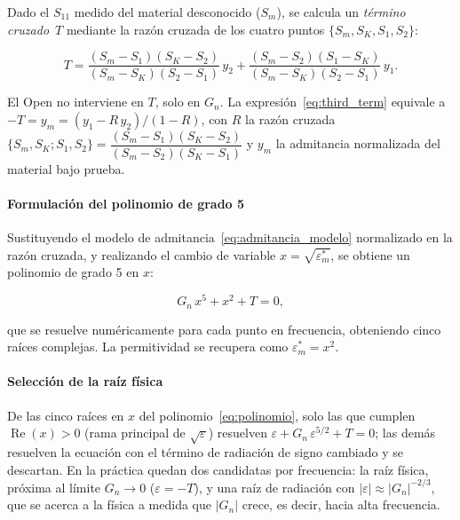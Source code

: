 Dado el $S_{11}$ medido del material desconocido ($S_m$), se calcula un
\emph{término cruzado}~$T$ mediante la razón cruzada de los cuatro puntos
$\{S_m, S_K, S_1, S_2\}$:

\begin{equation}
    T = \frac{(S_m - S_1)(S_K - S_2)}{(S_m - S_K)(S_2 - S_1)}\,y_2
      + \frac{(S_m - S_2)(S_1 - S_K)}{(S_m - S_K)(S_2 - S_1)}\,y_1.
    \label{eq:third_term}
\end{equation}

\noindent El Open no interviene en $T$, solo en $G_n$. La
expresión~\eqref{eq:third_term} equivale a $-T = y_m = (y_1 - R\,y_2)/(1 - R)$,
con $R$ la razón cruzada
$\{S_m, S_K; S_1, S_2\} = \dfrac{(S_m - S_1)(S_K - S_2)}{(S_m - S_2)(S_K - S_1)}$
y $y_m$ la admitancia normalizada del material bajo prueba.

\paragraph{Formulación del polinomio de grado 5}

Sustituyendo el modelo de admitancia~\eqref{eq:admitancia_modelo} normalizado
en la razón cruzada, y realizando el cambio de variable $x = \sqrt{\varepsilon_m^*}$,
se obtiene un polinomio de grado 5 en $x$:

\begin{equation}
    G_n\,x^5 + x^2 + T = 0,
    \label{eq:polinomio}
\end{equation}

que se resuelve numéricamente para cada punto en frecuencia, obteniendo cinco
raíces complejas. La permitividad se recupera como $\varepsilon_m^* = x^2$.

\paragraph{Selección de la raíz física}

De las cinco raíces en $x$ del polinomio~\eqref{eq:polinomio}, solo las que
cumplen $\operatorname{Re}(x) > 0$ (rama principal de $\sqrt{\varepsilon}$)
resuelven $\varepsilon + G_n\,\varepsilon^{5/2} + T = 0$; las demás resuelven la
ecuación con el término de radiación de signo cambiado y se descartan. En la
práctica quedan dos candidatas por frecuencia: la raíz física, próxima al límite
$G_n \to 0$ ($\varepsilon = -T$), y una raíz de radiación con
$|\varepsilon| \approx |G_n|^{-2/3}$, que se acerca a la física a medida que
$|G_n|$ crece, es decir, hacia alta frecuencia.


